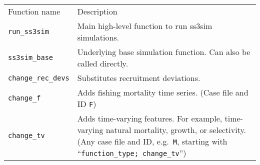 \documentclass[10pt]{article}
\begin{document}
\begin{thebibliography}{10}
\begin{longtable}[c]{@{}ll@{}}
\hline\noalign{\medskip}
\begin{minipage}[b]{0.32\columnwidth}\raggedright
Function name
\end{minipage} & \begin{minipage}[b]{0.57\columnwidth}\raggedright
Description
\end{minipage}
\\\noalign{\medskip}
\hline\noalign{\medskip}
\begin{minipage}[t]{0.32\columnwidth}\raggedright
\texttt{run\_ss3sim}
\end{minipage} & \begin{minipage}[t]{0.57\columnwidth}\raggedright
Main high-level function to run ss3sim simulations.
\end{minipage}
\\\noalign{\medskip}
\begin{minipage}[t]{0.32\columnwidth}\raggedright
\texttt{ss3sim\_base}
\end{minipage} & \begin{minipage}[t]{0.57\columnwidth}\raggedright
Underlying base simulation function. Can also be called directly.
\end{minipage}
\\\noalign{\medskip}
\begin{minipage}[t]{0.32\columnwidth}\raggedright
\texttt{change\_rec\_devs}
\end{minipage} & \begin{minipage}[t]{0.57\columnwidth}\raggedright
Substitutes recruitment deviations.
\end{minipage}
\\\noalign{\medskip}
\begin{minipage}[t]{0.32\columnwidth}\raggedright
\texttt{change\_f}
\end{minipage} & \begin{minipage}[t]{0.57\columnwidth}\raggedright
Adds fishing mortality time series. (Case file and ID \texttt{F})
\end{minipage}
\\\noalign{\medskip}
\begin{minipage}[t]{0.32\columnwidth}\raggedright
\texttt{change\_tv}
\end{minipage} & \begin{minipage}[t]{0.57\columnwidth}\raggedright
Adds time-varying features. For example, time-varying natural mortality, growth, or selectivity. (Any case file and ID, e.g.~\texttt{M}, starting with ``\texttt{function\_type; change\_tv}'')

\end{minipage}
\end{longtable}
\end{thebibliography}
\end{document}
